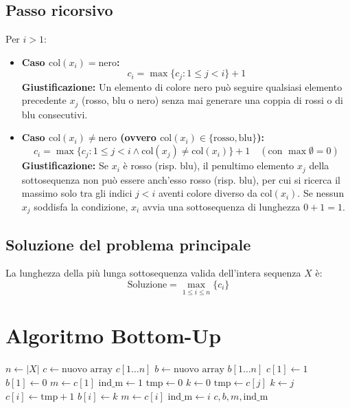 \subsection{Passo ricorsivo}
Per $i > 1$:
\begin{itemize}
    \item \textbf{Caso $\text{col}(x_i) = \text{nero}$:}
    \[
        c_i = \max \{ c_j : 1 \le j < i \} + 1
    \]
    \textbf{Giustificazione:} Un elemento di colore nero può seguire qualsiasi elemento precedente $x_j$ (rosso, blu o nero) senza mai generare una coppia di rossi o di blu consecutivi.

    \item \textbf{Caso $\text{col}(x_i) \neq \text{nero}$ (ovvero $\text{col}(x_i) \in \{\text{rosso}, \text{blu}\}$):}
    \[
        c_i = \max \{ c_j : 1 \le j < i \land \text{col}(x_j) \neq \text{col}(x_i) \} + 1 \quad (\text{con } \max \emptyset = 0)
    \]
    \textbf{Giustificazione:} Se $x_i$ è rosso (risp. blu), il penultimo elemento $x_j$ della sottosequenza non può essere anch'esso rosso (risp. blu), per cui si ricerca il massimo solo tra gli indici $j < i$ aventi colore diverso da $\text{col}(x_i)$. Se nessun $x_j$ soddisfa la condizione, $x_i$ avvia una sottosequenza di lunghezza $0 + 1 = 1$.
\end{itemize}

\subsection{Soluzione del problema principale}
La lunghezza della più lunga sottosequenza valida dell'intera sequenza $X$ è:
\[
    \text{Soluzione} = \max_{1 \le i \le n} \{ c_i \}
\]

\section{Algoritmo Bottom-Up}
\begin{algorithm}[htbp]
\caption{Calcolo Bottom-Up per Sottosequenza senza 2 rossi o 2 blu consecutivi}
\begin{algorithmic}[1]
    \State $n \gets |X|$
    \State $c \gets \text{nuovo array } c[1 \dots n]$ 
    \State $b \gets \text{nuovo array } b[1 \dots n]$ 
    \State $c[1] \gets 1$
    \State $b[1] \gets 0$
    \State $m \gets c[1]$
    \State $\text{ind\_m} \gets 1$
        \State $\text{tmp} \gets 0$
        \State $k \gets 0$
                    \State $\text{tmp} \gets c[j]$
                    \State $k \gets j$
                \EndIf
            \EndIf
        \EndFor
        \State $c[i] \gets \text{tmp} + 1$
        \State $b[i] \gets k$
            \State $m \gets c[i]$
            \State $\text{ind\_m} \gets i$
        \EndIf
    \EndFor
    \State \Return $c, b, m, \text{ind\_m}$
\EndProcedure
\end{algorithmic}
\end{algorithm}

